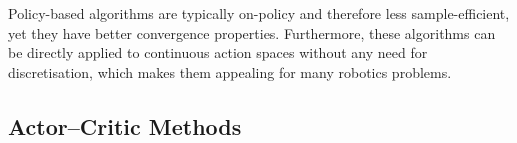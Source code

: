 Policy-based algorithms are typically on-policy and therefore less sample-efficient, yet they have better convergence properties. Furthermore, these algorithms can be directly applied to continuous action spaces without any need for discretisation, which makes them appealing for many robotics problems.


\subsection{Actor–Critic Methods}
